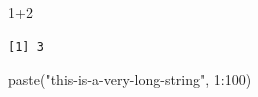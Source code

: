 \documentclass[
  letterpaper,
  DIV=11,
  numbers=noendperiod]{scrartcl}
\newenvironment{Shaded}{\begin{snugshade}}{\end{snugshade}}
\newcommand{\DecValTok}[1]{\textcolor[rgb]{0.68,0.00,0.00}{#1}}
\newcommand{\FunctionTok}[1]{\textcolor[rgb]{0.28,0.35,0.67}{#1}}
\newcommand{\NormalTok}[1]{\textcolor[rgb]{0.00,0.23,0.31}{#1}}
\newcommand{\SpecialCharTok}[1]{\textcolor[rgb]{0.37,0.37,0.37}{#1}}
\newcommand{\StringTok}[1]{\textcolor[rgb]{0.13,0.47,0.30}{#1}}
\begin{document}
\begin{Shaded}
\begin{Highlighting}[]
\DecValTok{1}\SpecialCharTok{+}\DecValTok{2}
\end{Highlighting}
\end{Shaded}

\begin{verbatim}
[1] 3
\end{verbatim}

\begin{Shaded}
\begin{Highlighting}[]
\FunctionTok{paste}\NormalTok{(}\StringTok{"this{-}is{-}a{-}very{-}long{-}string"}\NormalTok{, }\DecValTok{1}\SpecialCharTok{:}\DecValTok{100}\NormalTok{)}
\end{Highlighting}
\end{Shaded}
\end{document}
